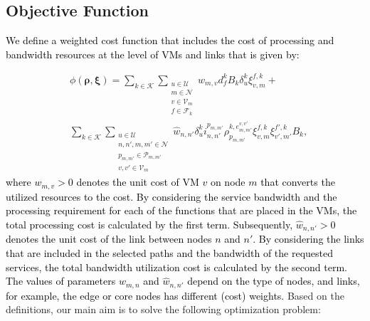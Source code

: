 \documentclass[20pt,twocolumn]{IEEEtran}
\begin{document}
\subsection{Objective Function}	
\textcolor{black}{We define a weighted  cost function that includes the  cost  of processing  and bandwidth  resources at the level of VMs and links that is given by:} %

\begin{align}
\label{main_problem}
&\phi(\boldsymbol{\rho}, \boldsymbol{\xi}) =\sum_{k\in\mathcal{K}}\sum_{\substack{{u\in\mathcal{U}}\\{m \in\mathcal{N}}\\{v\in\mathcal{V}_m}\\{f\in\mathcal{F}_k}}} w_{m,v}d_{{f}}^{k}{B}_{k}\delta_{u}^{k}\xi_{v,m}^{f,k} +\\
\nonumber &\sum_{k\in\mathcal{K}}\sum_{\substack{{u\in\mathcal{U}}\\{n,n',m,m'\in\mathcal{N}} \\p_{m,m'}\in\mathcal{P}_{m,m'}\\v,v'\in \mathcal{V}_m}} \hat{w}_{{n,n'}}\delta^{k}_{u} i^{p_{m,m'}}_{n,n'}\rho^{k,e^{v,v'}_{m,m'}}_{p_{m,m'}}\xi^{f,k}_{v,m}\xi^{f',k}_{v',m'}B_k,
\end{align}
\textcolor{black}{
where $w_{m,v} > 0$  denotes the  unit cost of VM $v$ on node $m$ that converts the utilized resources to the cost. 
By considering the service bandwidth and the processing requirement for each of the functions that are placed in the VMs, the total processing cost is calculated by the first term.
Subsequently, $\hat{w}_{n,n'} > 0$ denotes the  unit cost of the link between nodes $n$ and $n'$. By considering the links that are included in the selected paths and the bandwidth of the requested services, the total bandwidth utilization cost is calculated by the second term. \\
The values of parameters $w_{m,n}$ and $\hat{w}_{n,n'}$  depend on the type of nodes, and links, for example, the edge or core nodes has different  (cost) weights.}
Based on the definitions, our main aim is to solve the following optimization problem:
\end{document}
